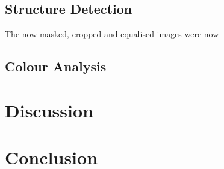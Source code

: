 
\subsection{Structure Detection}
The now masked, cropped and equalised images were now 

\subsection{Colour Analysis}



\section{Discussion}



\section{Conclusion}